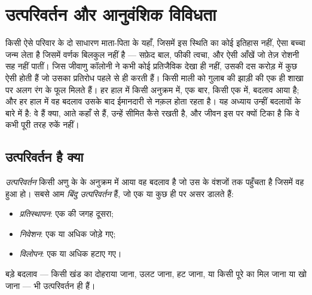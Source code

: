 \chapter{उत्परिवर्तन और आनुवंशिक विविधता}\label{ch:g11:mutations}

किसी ऐसे परिवार के दो साधारण माता-पिता के यहाँ, जिसमें इस स्थिति का कोई
इतिहास नहीं, ऐसा बच्चा जन्म लेता है जिसमें वर्णक बिलकुल नहीं है --- सफ़ेद
बाल, फीकी त्वचा, और ऐसी आँखें जो तेज़ रोशनी सह नहीं पातीं। जिस जीवाणु
कॉलोनी ने कभी कोई प्रतिजैविक देखा ही नहीं, उसकी दस करोड़  में
कुछ ऐसी होती हैं जो उसका प्रतिरोध पहले से ही करती हैं। किसी माली को गुलाब
की झाड़ी की एक ही शाखा पर अलग रंग के फूल मिलते हैं। हर हाल में किसी 
अनुक्रम में, एक बार, किसी एक  में, बदलाव आया है; और हर हाल में वह
बदलाव उसके बाद ईमानदारी से नक़ल होता रहता है। यह अध्याय उन्हीं बदलावों के
बारे में है: वे हैं क्या, आते कहाँ से हैं,  उन्हें सीमित कैसे रखती
है, और जीवन इस पर क्यों टिका है कि वे कभी पूरी तरह रुकें नहीं।

\section{उत्परिवर्तन है क्या}

\begin{definition}[उत्परिवर्तन]\label{def:g11:mutations:mutation}
\emph{उत्परिवर्तन} किसी  अणु के  के
अनुक्रम में आया वह बदलाव है जो उस  के वंशजों तक पहुँचता है जिसमें वह
हुआ हो। सबसे आम \emph{बिंदु उत्परिवर्तन} हैं, जो एक या कुछ ही
 पर असर डालते हैं:
\begin{itemize}
  \item \emph{प्रतिस्थापन}: एक  की जगह दूसरा;
  \item \emph{निवेशन}: एक या अधिक  जोड़े गए;
  \item \emph{विलोपन}: एक या अधिक  हटाए गए।
\end{itemize}
बड़े बदलाव --- किसी खंड का दोहराया जाना, उलट जाना, हट जाना, या किसी पूरे
 का मिल जाना या खो जाना --- भी उत्परिवर्तन ही हैं।
\end{definition}

